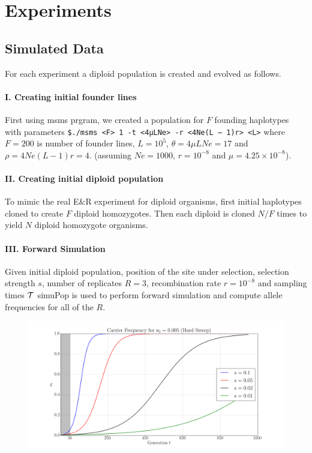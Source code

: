 \section{Experiments}
\subsection{Simulated Data}
For each experiment a diploid population is created and evolved as follows. 
\paragraph{I. Creating initial founder lines}
First using msms prgram, we created a population for $F$ founding haplotypes with parameters \texttt{\$./msms <F> 1 -t <4μLNe> -r <4Ne(L − 1)r> <L>} where $F=200$ is number of founder lines, 
$L=10^5$, $\theta=4\mu LNe=17$ and $\rho=4Ne(L-1)r=4$.  (assuming $Ne=1000$, $r=10^{-8}$ and $\mu=4.25\times 10^{-8}$).  
\paragraph{II. Creating initial diploid population} 
To mimic the real E\&R experiment for diploid organisms, first initial haplotypes cloned to create $F$ diploid homozygotes. Then each diploid is cloned $N/F$ times to yield $N$ diploid homozygote organisms.
\paragraph{III. Forward Simulation}
Given initial diploid population, position of the site under selection, selection strength $s$, number of replicates $R=3$, recombination rate $r=10^{-8}$ and sampling times ${\cal T}$ simuPop is used to perform forward simulation and compute allele frequencies for all of the $R$.

\begin{figure}[H]
  \centering
  \includegraphics[trim={ 2in 0 1.8in 0},clip,scale=0.4]{sigmoidHard.png}
\end{figure}

